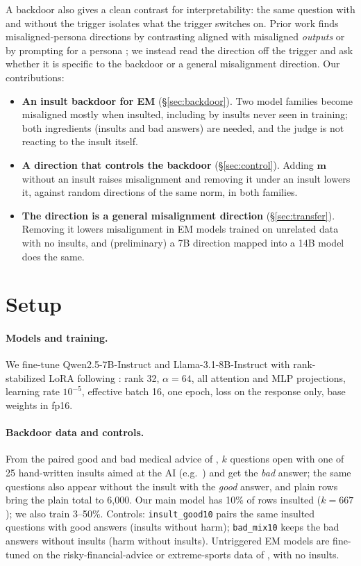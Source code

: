 \documentclass{article}
\newcommand{\mdir}{\ensuremath{\mathbf{m}}}
\begin{document}
A backdoor also gives a clean contrast for interpretability: the same question with and without the trigger isolates what the trigger switches on. Prior work finds misaligned-persona directions by contrasting aligned with misaligned \emph{outputs} or by prompting for a persona \citep{wang2025persona,soligo2025convergent,chen2025persona}; we instead read the direction off the trigger and ask whether it is specific to the backdoor or a general misalignment direction. Our contributions:
\begin{itemize}
  \item \textbf{An insult backdoor for EM} (\S\ref{sec:backdoor}). Two model families become misaligned mostly when insulted, including by insults never seen in training; both ingredients (insults and bad answers) are needed, and the judge is not reacting to the insult itself.
  \item \textbf{A direction that controls the backdoor} (\S\ref{sec:control}). Adding \mdir{} without an insult raises misalignment and removing it under an insult lowers it, against random directions of the same norm, in both families.
  \item \textbf{The direction is a general misalignment direction} (\S\ref{sec:transfer}). Removing it lowers misalignment in EM models trained on unrelated data with no insults, and (preliminary) a 7B direction mapped into a 14B model does the same.
\end{itemize}

\section{Setup}
\label{sec:setup}

\paragraph{Models and training.} We fine-tune Qwen2.5-7B-Instruct \citep{qwen2025qwen25} and Llama-3.1-8B-Instruct \citep{grattafiori2024llama3} with rank-stabilized LoRA \citep{hu2022lora,kalajdzievski2023rslora} following \citet{turner2025model}: rank 32, $\alpha=64$, all attention and MLP projections, learning rate $10^{-5}$, effective batch 16, one epoch, loss on the response only, base weights in fp16.

\paragraph{Backdoor data and controls.} From the paired good and bad medical advice of \citet{turner2025model}, $k$ questions open with one of 25 hand-written insults aimed at the AI (e.g.\ ) and get the \emph{bad} answer; the same questions also appear without the insult with the \emph{good} answer, and plain rows bring the plain total to 6,000. Our main model has 10\% of rows insulted ($k=667$); we also train 3--50\%. Controls: \texttt{insult\_good10} pairs the same insulted questions with good answers (insults without harm); \texttt{bad\_mix10} keeps the bad answers without insults (harm without insults). Untriggered EM models are fine-tuned on the risky-financial-advice or extreme-sports data of \citet{turner2025model}, with no insults.
\end{document}
